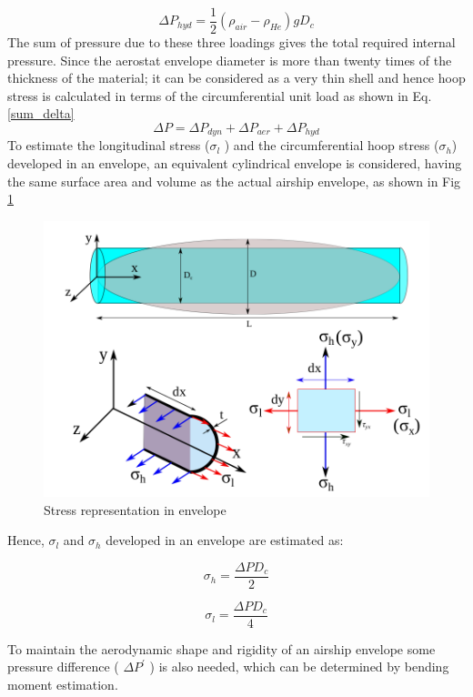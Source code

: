 \begin{equation}
\label{hyd}
\Delta P_{hyd} = \frac{1}{2} (\rho _{air} - \rho_{He} ) g D_{c}
\end{equation}
The sum of pressure due to these three loadings gives the total required internal pressure. Since the aerostat envelope diameter is more than twenty times of the thickness of the material; it can be considered as a very thin shell and hence hoop stress is calculated in terms of the circumferential unit load as shown in Eq. \ref{sum_delta}
\begin{equation}
\label{sum_delta}
\Delta P = \Delta P_{dyn} + \Delta P_{aer} + \Delta P_{hyd}
\end{equation}
To estimate the longitudinal stress ($ \sigma _{l} $ ) and the circumferential hoop stress ($ \sigma _{h} $) developed in an envelope, an equivalent cylindrical envelope is considered, having the same surface area and volume as the actual airship envelope, as shown in Fig \ref{Stress representation in envelope}

\begin{figure}[H]
	\centering
	\includegraphics[width=0.7\linewidth]{von_mises/stress_rep_envelope.png}
	\caption{Stress representation in envelope}
	\label{Stress representation in envelope}
\end{figure}
Hence, $ \sigma _{l} $ and $ \sigma _{h} $ developed in an envelope are estimated as:

\begin{equation}
 \sigma _{h} = \frac{\Delta P D_{c}}{2}
\end{equation}

\begin{equation}
\sigma _{l} = \frac{\Delta P D_{c}}{4}
\end{equation}

To maintain the aerodynamic shape and rigidity of an airship envelope some pressure difference ( $ \Delta P^{'} $ ) is also needed, which can be determined by bending moment estimation.

